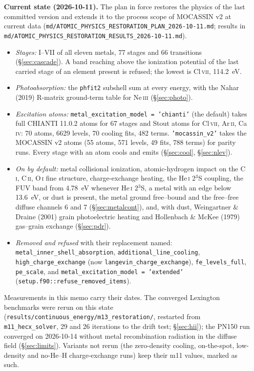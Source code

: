 \documentclass[english,a4paper]{my_memo}
\newcommand{\code}[1]{\texttt{#1}}
\begin{document}
\begin{sloppypar}
\noindent\textbf{Current state (2026-10-11).}
The plan in force restores the physics of the last committed version and
extends it to the process scope of MOCASSIN v2 at current data
(\code{md/ATOMIC\_PHYSICS\_RESTORATION\_PLAN\_2026-10-11.md}; results in
\code{md/ATOMIC\_PHYSICS\_RESTORATION\_RESULTS\_2026-10-11.md}).
\begin{itemize}\itemsep1pt
\item \emph{Stages:} I--VII of all eleven metals, 77 stages and 66
  transitions (\S\ref{sec:cascade}).  A band reaching above the ionization
  potential of the last carried stage of an element present is refused; the
  lowest is Cl\,\textsc{vii}, 114.2~eV.
\item \emph{Photoabsorption:} the \code{phfit2} subshell sum at every
  energy, with the Nahar (2019) R-matrix ground-term table for
  Ne\,\textsc{iii} (\S\ref{sec:photo}).
\item \emph{Excitation atoms:} \code{metal\_excitation\_model = 'chianti'}
  (the default) takes full CHIANTI 11.0.2 atoms for 67 stages and Stout
  atoms for Cl\,\textsc{vii}, Ar\,\textsc{ii}, Ca\,\textsc{iv}: 70 atoms,
  6629 levels, 70 cooling fits, 482 terms.  \code{'mocassin\_v2'} takes the
  MOCASSIN v2 atoms (55 atoms, 571 levels, 49 fits, 788 terms) for parity
  runs.  Every stage with an atom cools and emits (\S\ref{sec:cool},
  \S\ref{sec:nlev}).
\item \emph{On by default:} metal collisional ionization, atomic-hydrogen
  impact on the C\,\textsc{i}, C\,\textsc{ii}, O\,\textsc{i} fine structure,
  charge-exchange heating, the He\,\textsc{i} 2$^3$S coupling, the FUV band
  from 4.78~eV whenever He\,\textsc{i} 2$^3$S, a metal with an edge below
  13.6~eV, or dust is present, the metal ground free--bound and the
  free--free diffuse channels 6 and 7 (\S\ref{sec:metalcont}), and, with
  dust, Weingartner \& Draine (2001) grain photoelectric heating and
  Hollenbach \& McKee (1979) gas--grain exchange (\S\ref{sec:pdr}).
\item \emph{Removed and refused} with their replacement named:
  \code{metal\_inner\_shell\_absorption}, \code{additional\_line\_cooling},
  \code{high\_charge\_exchange} (now \code{langevin\_charge\_exchange}),
  \code{fe\_levels\_full}, \code{pe\_scale}, and
  \code{metal\_excitation\_model = 'extended'}
  (\code{setup.f90::refuse\_removed\_items}).
\end{itemize}
Measurements in this memo carry their dates.  The converged Lexington
benchmarks were rerun on this state
(\code{results/\allowbreak continuous\_energy/\allowbreak m13\_restoration/},
restarted from \code{m11\_hecx\_solver}, 29 and 26 iterations to the drift
test; \S\ref{sec:hii}); the PN150 run converged on 2026-10-14 without
metal recombination radiation in the diffuse field (\S\ref{sec:limits}).  Variants not
rerun (the zero-density cooling, on-the-spot, low-density and no-He--H
charge-exchange runs) keep their m11 values, marked as such.
\end{sloppypar}
\end{document}
